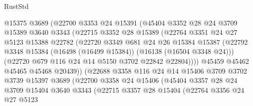 \begin{lexlean}{RustStd}
\begin{coremodule}
                      @15375
                      @3689
                      (@22700
                        @3353
                        @24
                        @15391
                        (@45404
                          @3352
                          @28
                          @24
                          @3709
                          @15389
                          @3640
                          @3343
                          (@22715
                            @3352
                            @28
                            @15389
                            (@22764
                              @3351
                              @24
                              @27
                              @5123
                              @15388
                              @22782
                              (@22720
                                @3349
                                @681
                                @24
                                @26
                                @15384
                                @15387
                                (@22792
                                  @3348
                                  @15384
                                  (@16498 (@16499 @15384))
                                  (@16138 (@16504 @3348 @24)))
                                (@22720 @679 @116 @24 @14 @5150 @3702 @22842 @22804))))
                          @45459
                          @45462
                          @45465
                          @45468
                          @20439))
                      (@22688
                        @3358
                        @116
                        @24
                        @14
                        @15406
                        @3709
                        @3702
                        @3739
                        @15397
                        @3689
                        (@22700
                          @3358
                          @24
                          @15406
                          (@45404
                            @3357
                            @28
                            @24
                            @3709
                            @15404
                            @3640
                            @3343
                            (@22715
                              @3357
                              @28
                              @15404
                              (@22764
                                @3356
                                @24
                                @27
                                @5123

\end{coremodule}
\end{lexlean}
